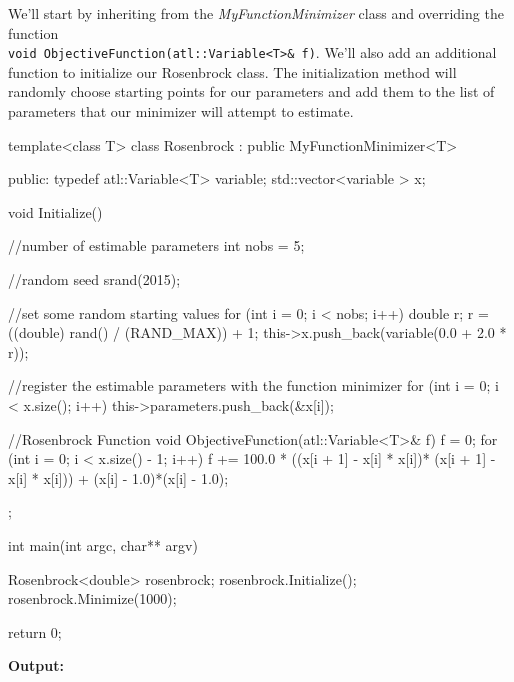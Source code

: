 \documentclass[12pt,a4paper]{article}
\newcommand{\Code}[1]{%
\lstinline{#1}}
\begin{document}
We'll start by inheriting from the \textit{MyFunctionMinimizer} class and overriding the function \\ \Code{void ObjectiveFunction(atl::Variable<T>& f)}. We'll also add an additional function to initialize our Rosenbrock class. The initialization method will randomly choose starting points for our parameters and add them to the list of parameters that our minimizer will attempt to estimate.
 \begin{cppsource}
  template<class T>
    class Rosenbrock : public MyFunctionMinimizer<T> {
    public:
        typedef atl::Variable<T> variable;
        std::vector<variable > x;

        void Initialize() {
        
            //number of estimable parameters 
            int nobs = 5;
            
            //random seed
            srand(2015);

            //set some random starting values
            for (int i = 0; i < nobs; i++) {
                double r;
                r = ((double) rand() / (RAND_MAX)) + 1;
                this->x.push_back(variable(0.0 + 2.0 * r));
            }

            //register the estimable parameters with the function minimizer
            for (int i = 0; i < x.size(); i++) {
                this->parameters.push_back(&x[i]);
            }
        }

        //Rosenbrock Function
        void ObjectiveFunction(atl::Variable<T>& f) {
            f = 0;
            for (int i = 0; i < x.size() - 1; i++) {
                f += 100.0 * ((x[i + 1] - x[i] * x[i])*
                        (x[i + 1] - x[i] * x[i])) + (x[i] - 1.0)*(x[i] - 1.0);
            }
        }
    };
    
    
    
 int main(int argc, char** argv) {

     Rosenbrock<double> rosenbrock;
     rosenbrock.Initialize();
     rosenbrock.Minimize(1000);
    
     return 0;
  }   
\end{cppsource}
\newpage
\textbf{Output:} 
\end{document}
